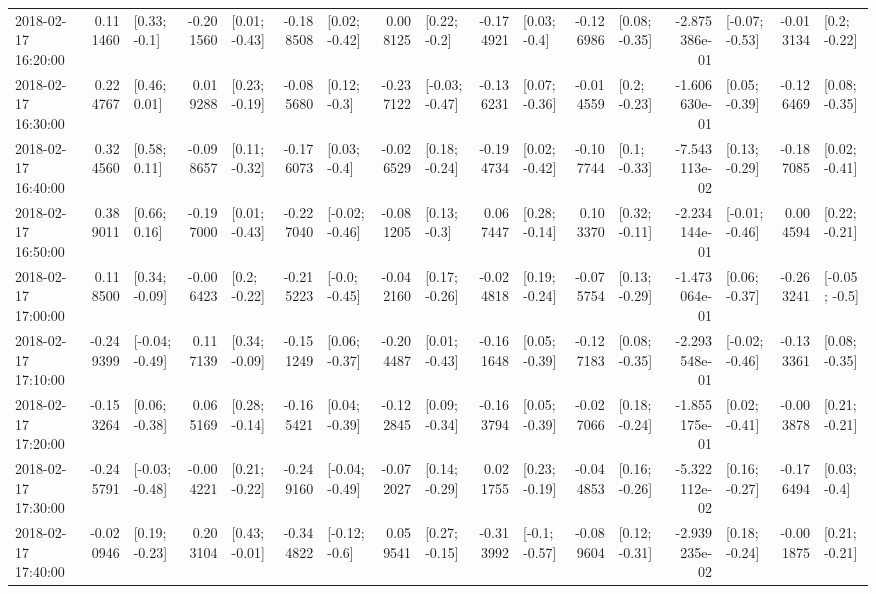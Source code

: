 \begin{tabular}{lrlrlrlrlrlrlrlrl}
2018-02-17 16:20:00 &  0.111460 &    [0.33; -0.1] & -0.201560 &   [0.01; -0.43] & -0.188508 &   [0.02; -0.42] &  0.008125 &    [0.22; -0.2] & -0.174921 &    [0.03; -0.4] & -0.126986 &   [0.08; -0.35] & -2.875386e-01 &  [-0.07; -0.53] & -0.013134 &    [0.2; -0.22] \\
2018-02-17 16:30:00 &  0.224767 &    [0.46; 0.01] &  0.019288 &   [0.23; -0.19] & -0.085680 &    [0.12; -0.3] & -0.237122 &  [-0.03; -0.47] & -0.136231 &   [0.07; -0.36] & -0.014559 &    [0.2; -0.23] & -1.606630e-01 &   [0.05; -0.39] & -0.126469 &   [0.08; -0.35] \\
2018-02-17 16:40:00 &  0.324560 &    [0.58; 0.11] & -0.098657 &   [0.11; -0.32] & -0.176073 &    [0.03; -0.4] & -0.026529 &   [0.18; -0.24] & -0.194734 &   [0.02; -0.42] & -0.107744 &    [0.1; -0.33] & -7.543113e-02 &   [0.13; -0.29] & -0.187085 &   [0.02; -0.41] \\
2018-02-17 16:50:00 &  0.389011 &    [0.66; 0.16] & -0.197000 &   [0.01; -0.43] & -0.227040 &  [-0.02; -0.46] & -0.081205 &    [0.13; -0.3] &  0.067447 &   [0.28; -0.14] &  0.103370 &   [0.32; -0.11] & -2.234144e-01 &  [-0.01; -0.46] &  0.004594 &   [0.22; -0.21] \\
2018-02-17 17:00:00 &  0.118500 &   [0.34; -0.09] & -0.006423 &    [0.2; -0.22] & -0.215223 &   [-0.0; -0.45] & -0.042160 &   [0.17; -0.26] & -0.024818 &   [0.19; -0.24] & -0.075754 &   [0.13; -0.29] & -1.473064e-01 &   [0.06; -0.37] & -0.263241 &   [-0.05; -0.5] \\
2018-02-17 17:10:00 & -0.249399 &  [-0.04; -0.49] &  0.117139 &   [0.34; -0.09] & -0.151249 &   [0.06; -0.37] & -0.204487 &   [0.01; -0.43] & -0.161648 &   [0.05; -0.39] & -0.127183 &   [0.08; -0.35] & -2.293548e-01 &  [-0.02; -0.46] & -0.133361 &   [0.08; -0.35] \\
2018-02-17 17:20:00 & -0.153264 &   [0.06; -0.38] &  0.065169 &   [0.28; -0.14] & -0.165421 &   [0.04; -0.39] & -0.122845 &   [0.09; -0.34] & -0.163794 &   [0.05; -0.39] & -0.027066 &   [0.18; -0.24] & -1.855175e-01 &   [0.02; -0.41] & -0.003878 &   [0.21; -0.21] \\
2018-02-17 17:30:00 & -0.245791 &  [-0.03; -0.48] & -0.004221 &   [0.21; -0.22] & -0.249160 &  [-0.04; -0.49] & -0.072027 &   [0.14; -0.29] &  0.021755 &   [0.23; -0.19] & -0.044853 &   [0.16; -0.26] & -5.322112e-02 &   [0.16; -0.27] & -0.176494 &    [0.03; -0.4] \\
2018-02-17 17:40:00 & -0.020946 &   [0.19; -0.23] &  0.203104 &   [0.43; -0.01] & -0.344822 &   [-0.12; -0.6] &  0.059541 &   [0.27; -0.15] & -0.313992 &   [-0.1; -0.57] & -0.089604 &   [0.12; -0.31] & -2.939235e-02 &   [0.18; -0.24] & -0.001875 &   [0.21; -0.21] \\

\end{tabular}
